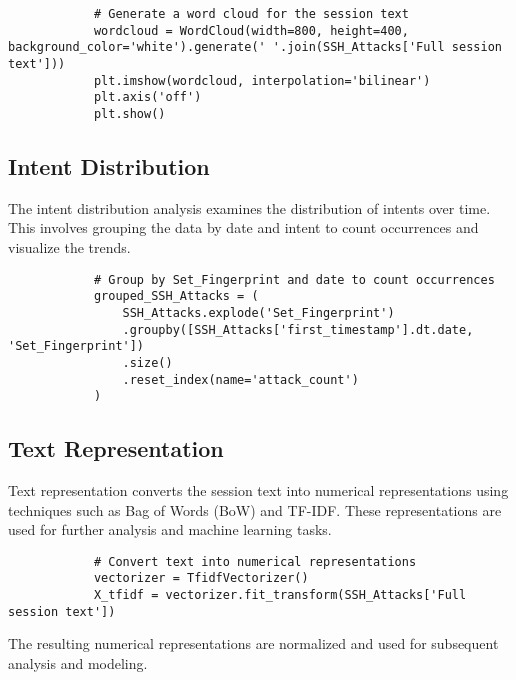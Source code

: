         \begin{verbatim}
            # Generate a word cloud for the session text
            wordcloud = WordCloud(width=800, height=400, background_color='white').generate(' '.join(SSH_Attacks['Full session text']))
            plt.imshow(wordcloud, interpolation='bilinear')
            plt.axis('off')
            plt.show()
        \end{verbatim}

    \subsection{Intent Distribution}
            
        The intent distribution analysis examines the distribution of intents over time. This involves grouping the data by date and intent to count occurrences and visualize the trends.

        \begin{verbatim}
            # Group by Set_Fingerprint and date to count occurrences
            grouped_SSH_Attacks = (
                SSH_Attacks.explode('Set_Fingerprint')
                .groupby([SSH_Attacks['first_timestamp'].dt.date, 'Set_Fingerprint'])
                .size()
                .reset_index(name='attack_count')
            )
        \end{verbatim}

    \subsection{Text Representation}
    
        Text representation converts the session text into numerical representations using techniques such as Bag of Words (BoW) and TF-IDF. These representations are used for further analysis and machine learning tasks.

        \begin{verbatim}
            # Convert text into numerical representations
            vectorizer = TfidfVectorizer()
            X_tfidf = vectorizer.fit_transform(SSH_Attacks['Full session text'])
        \end{verbatim}

        The resulting numerical representations are normalized and used for subsequent analysis and modeling.
